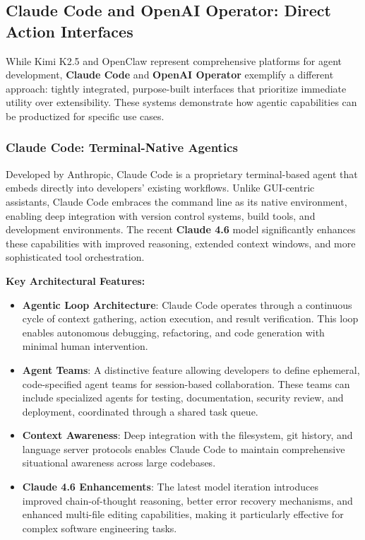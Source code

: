 \subsection{Claude Code and OpenAI Operator: Direct Action Interfaces}

While Kimi K2.5 and OpenClaw represent comprehensive platforms for agent development, \textbf{Claude Code} and \textbf{OpenAI Operator} exemplify a different approach: tightly integrated, purpose-built interfaces that prioritize immediate utility over extensibility. These systems demonstrate how agentic capabilities can be productized for specific use cases.

\subsubsection{Claude Code: Terminal-Native Agentics}

Developed by Anthropic, Claude Code is a proprietary terminal-based agent that embeds directly into developers' existing workflows. Unlike GUI-centric assistants, Claude Code embraces the command line as its native environment, enabling deep integration with version control systems, build tools, and development environments. The recent \textbf{Claude 4.6} model significantly enhances these capabilities with improved reasoning, extended context windows, and more sophisticated tool orchestration.

\textbf{Key Architectural Features:}

\begin{itemize}
    \item \textbf{Agentic Loop Architecture}: Claude Code operates through a continuous cycle of context gathering, action execution, and result verification. This loop enables autonomous debugging, refactoring, and code generation with minimal human intervention.

    \item \textbf{Agent Teams}: A distinctive feature allowing developers to define ephemeral, code-specified agent teams for session-based collaboration. These teams can include specialized agents for testing, documentation, security review, and deployment, coordinated through a shared task queue.

    \item \textbf{Context Awareness}: Deep integration with the filesystem, git history, and language server protocols enables Claude Code to maintain comprehensive situational awareness across large codebases.

    \item \textbf{Claude 4.6 Enhancements}: The latest model iteration introduces improved chain-of-thought reasoning, better error recovery mechanisms, and enhanced multi-file editing capabilities, making it particularly effective for complex software engineering tasks.

\end{itemize}
